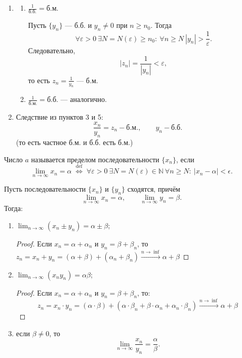 \begin{enumerate}
\item
\begin{enumerate}
\item[(5.1)] \(\displaystyle \frac{1}{\text{б.б.}}=\text{б.м.}\)

Пусть \(\{y_n\}\) --- б.б. и \(y_n\ne 0\) при \(n\ge n_0\). Тогда
\[
\forall \varepsilon>0\ \exists N=N(\varepsilon)\ge n_0:\ \forall n\ge N\
|y_n|>\frac{1}{\varepsilon}.
\]
Следовательно,
\[
|z_n|=\frac{1}{|y_n|}<\varepsilon,
\]
то есть \(z_n=\frac{1}{y_n}\) --- б.м.

\item[(5.2)] \(\displaystyle \frac{1}{\text{б.м.}}=\text{б.б.}\) --- аналогично.
\end{enumerate}

\item Следствие из пунктов 3 и 5:
\[
\frac{x_n}{y_n}=z_n-\text{б.м.},\qquad y_n-\text{б.б.}
\]
(то есть частное б.м. и б.б. есть б.м.)

\end{enumerate}


\begin{definition}
Число \(a\) называется пределом последовательности \(\{x_n\}\), если
\[
\lim_{n\to\infty} x_n = \alpha
\;\overset{\text{def}}{\Longleftrightarrow}\;
\forall \varepsilon>0\ \exists N=N(\varepsilon)\in\mathbb N\
\forall n\ge N:\ |x_n-\alpha|<\epsilon.
\]
\end{definition}

\begin{theorem}
Пусть последовательности \(\{x_n\}\) и \(\{y_n\}\) сходятся, причём
\[
\lim_{n\to\infty} x_n = \alpha,\qquad
\lim_{n\to\infty} y_n = \beta.
\]
Тогда:
\begin{enumerate}
\item \(\displaystyle \lim_{n\to\infty}(x_n\pm y_n)=\alpha\pm\beta\);
\begin{proof}
Если \(x_n = \alpha + \alpha_n\) и \(y_n = \beta + \beta_n\), то
\(z_n = x_n + y_n = (\alpha + \beta) + (\alpha_n + \beta_n)
\xrightarrow{n \rightarrow \inf} \alpha + \beta\)
\end{proof}

\item \(\displaystyle \lim_{n\to\infty}(x_n y_n)=\alpha\beta\);
\begin{proof}
Если \(x_n = \alpha + \alpha_n\) и \(y_n = \beta + \beta_n\), то:
\[
z_n = x_n \cdot y_n = (\alpha \cdot \beta) + (\alpha \cdot \beta_n +
\beta \cdot \alpha_n +\alpha_n \cdot \beta_n) \xrightarrow{n \rightarrow \inf}
\alpha + \beta
\]
\end{proof}

\item если \(\beta\ne 0\), то
\[
\lim_{n\to\infty}\frac{x_n}{y_n}=\frac{\alpha}{\beta}.
\]
\end{enumerate}
\end{theorem}

